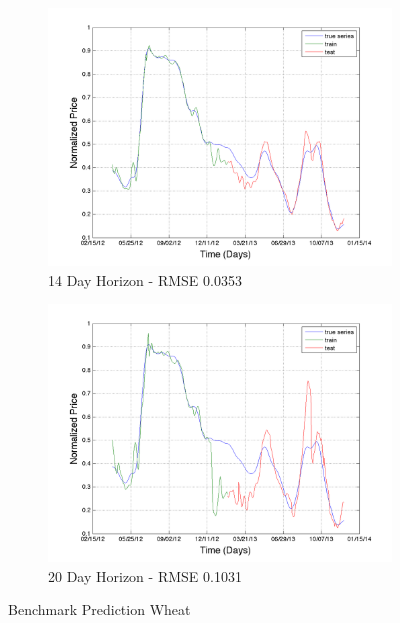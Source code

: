 \begin{figure}
       \hfill
       
        \begin{subfigure}[b]{0.5\textwidth}
                \includegraphics[width=\textwidth]{img/model/wheat/pred_14}
                \caption{14 Day Horizon - RMSE 0.0353}
                \label{fig:mouse}
        \end{subfigure}%
         \begin{subfigure}[b]{0.5\textwidth}
                \includegraphics[width=\textwidth]{img/model/wheat/pred_20}
                \caption{20 Day Horizon - RMSE  0.1031}
                \label{fig:mouse}
        \end{subfigure}
        \caption{Benchmark Prediction Wheat}
        \label{fig:wheat_1}
\end{figure}





